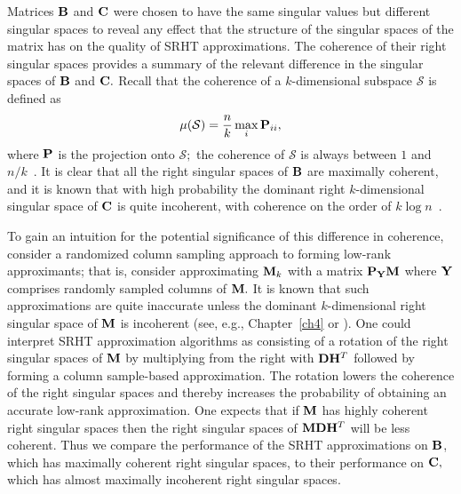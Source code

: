 Matrices $\mathbf{B}$ and $\mathbf{C}$ were chosen to have the same singular values but
different singular spaces to reveal any effect that the structure of the
singular spaces of the matrix has on the quality of SRHT approximations.
The coherence of their right singular spaces provides a
summary of the relevant difference in the singular spaces of $\mathbf{B}$ and 
$\mathbf{C}.$ Recall that the coherence of a $k$-dimensional subspace 
$\mathcal{S}$ is defined as
\[
 \mu(\mathcal{S}) = \frac{n}{k} \max_{i} \mathbf{P}_{ii},
\]
where $\mathbf{P}$ is the projection onto $\mathcal{S};$ the coherence of 
$\mathcal{S}$ is always between $1$ and $n/k$~\cite{CR09}. 
It is clear that all the right singular spaces of $\mathbf{B}$ are maximally 
coherent, and it is known that with high probability the 
dominant right $k$-dimensional singular space of $\mathbf{C}$ is quite 
incoherent, with coherence on the order of $ k \log n$~\cite{CR09}.

To gain an intuition for the potential significance of this difference in 
coherence, consider a randomized column 
sampling approach to forming low-rank approximants; that is, consider 
approximating $\mathbf{M}_k$ with a matrix 
$\mathbf{P}_{\mathbf{Y}} \mathbf{M}$ where $\mathbf{Y}$ comprises randomly sampled columns of 
$\mathbf{M}.$ It is known that such 
approximations are quite inaccurate unless the dominant $k$-dimensional 
right singular space of $\mathbf{M}$ is 
incoherent (see, e.g., Chapter~\ref{ch4} or \cite{RT10}). One could interpret 
SRHT approximation algorithms as consisting of a rotation
of the right singular spaces of $\mathbf{M}$ by multiplying from the right with 
$\mathbf{D} \mathbf{H}^T$ followed by 
forming a column sample-based approximation. The rotation lowers the coherence
of the right singular spaces and 
thereby increases the probability of obtaining an accurate low-rank 
approximation. One expects that if $\mathbf{M}$ has 
highly coherent right singular spaces then the right singular spaces of 
$\mathbf{M} \mathbf{D} \mathbf{H} ^T$ will be less 
coherent. Thus we compare the 
performance of the SRHT approximations on 
$\mathbf{B}$, which has maximally coherent right singular spaces, to their 
performance on $\mathbf{C},$ which has almost 
maximally incoherent right singular spaces.

